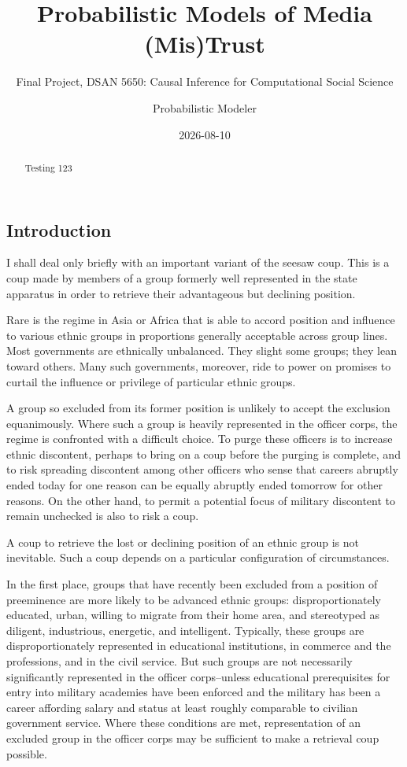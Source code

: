 \documentclass[
  letterpaper,
  DIV=11,
  numbers=noendperiod]{scrartcl}
\title{Probabilistic Models of Media (Mis)Trust}
\subtitle{Final Project, DSAN 5650: Causal Inference for Computational
Social Science}
\author{Probabilistic Modeler}
\date{2026-08-10}
\begin{document}
\maketitle
\begin{abstract}
Testing 123
\end{abstract}


\subsection{Introduction}\label{introduction}

I shall deal only briefly with an important variant of the seesaw coup.
This is a coup made by members of a group formerly well represented in
the state apparatus in order to retrieve their advantageous but
declining position.

Rare is the regime in Asia or Africa that is able to accord position and
influence to various ethnic groups in proportions generally acceptable
across group lines. Most governments are ethnically unbalanced. They
slight some groups; they lean toward others. Many such governments,
moreover, ride to power on promises to curtail the influence or
privilege of particular ethnic groups.

A group so excluded from its former position is unlikely to accept the
exclusion equanimously. Where such a group is heavily represented in the
officer corps, the regime is confronted with a difficult choice. To
purge these officers is to increase ethnic discontent, perhaps to bring
on a coup before the purging is complete, and to risk spreading
discontent among other officers who sense that careers abruptly ended
today for one reason can be equally abruptly ended tomorrow for other
reasons. On the other hand, to permit a potential focus of military
discontent to remain unchecked is also to risk a coup.

A coup to retrieve the lost or declining position of an ethnic group is
not inevitable. Such a coup depends on a particular configuration of
circumstances.

In the first place, groups that have recently been excluded from a
position of preeminence are more likely to be advanced ethnic groups:
disproportionately educated, urban, willing to migrate from their home
area, and stereotyped as diligent, industrious, energetic, and
intelligent. Typically, these groups are disproportionately represented
in educational institutions, in commerce and the professions, and in the
civil service. But such groups are not necessarily significantly
represented in the officer corps--unless educational prerequisites for
entry into military academies have been enforced and the military has
been a career affording salary and status at least roughly comparable to
civilian government service. Where these conditions are met,
representation of an excluded group in the officer corps may be
sufficient to make a retrieval coup possible.
\end{document}
